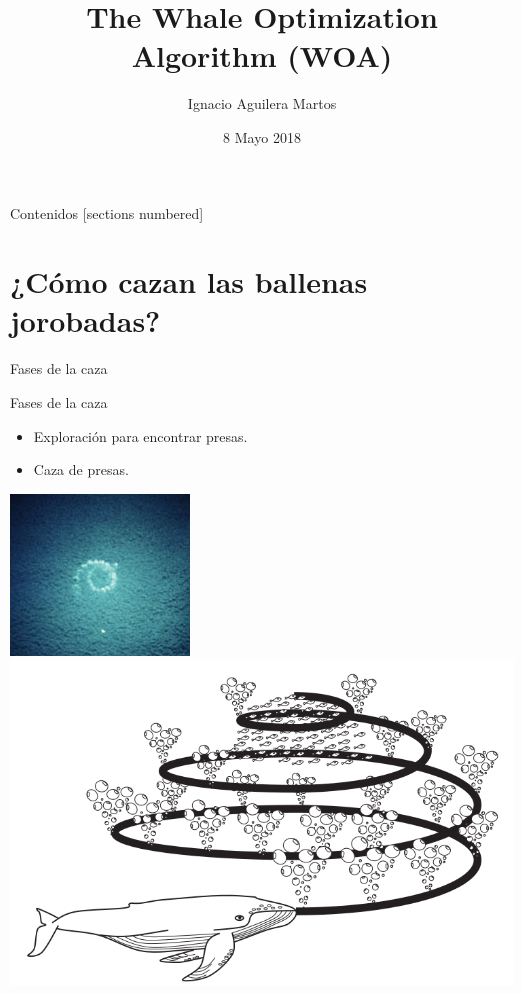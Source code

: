 \documentclass[10pt]{beamer}
\title{The Whale Optimization Algorithm (WOA)}
\author{Ignacio Aguilera Martos}
\date{8 Mayo 2018}
\institute{Metaheurísticas}
\begin{document}
\maketitle

\begin{frame}[fragile]{Contenidos}
  [sections numbered]
  \tableofcontents[hideallsubsections]
\end{frame}

\section{¿Cómo cazan las ballenas jorobadas?}

\begin{frame}[fragile]{Fases de la caza}
	\vspace{10px}
	\pause
	\begin{block}{Fases de la caza}
		\begin{itemize}
			\item Exploración para encontrar presas.
			\pause
			\item Caza de presas.
		\end{itemize}
	\end{block}
	\pause
	\begin{center}
		\includegraphics[scale=0.7]{./Imagenes/imagen1.jpg}
		\hspace{10px}
		\includegraphics[scale=0.22]{./Imagenes/imagen2.png}
	\end{center}
\end{frame}
\end{document}
